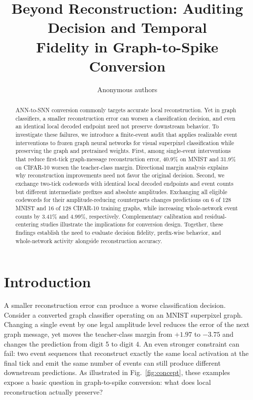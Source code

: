 \documentclass[10pt,twocolumn,letterpaper]{article}
\title{Beyond Reconstruction: Auditing Decision and Temporal\\Fidelity in Graph-to-Spike Conversion}
\author{Anonymous authors}
\begin{document}
\makeatletter
\def\columnwiseLineNumber{%
  \if@firstcolumn
    \makeLineNumberLeft
  \else
    \makeLineNumberRight
  \fi}
\let\makeLineNumberOdd\columnwiseLineNumber
\let\makeLineNumberEven\columnwiseLineNumber
\makeatother
\maketitle

\begin{abstract}
ANN-to-SNN conversion commonly targets accurate local reconstruction. Yet in graph classifiers, a smaller reconstruction error can worsen a classification decision, and even an identical local decoded endpoint need not preserve downstream behavior. To investigate these failures, we introduce a finite-event audit that applies realizable event interventions to frozen graph neural networks for visual superpixel classification while preserving the graph and pretrained weights. First, among single-event interventions that reduce first-tick graph-message reconstruction error, 40.9\% on MNIST and 31.9\% on CIFAR-10 worsen the teacher-class margin. Directional margin analysis explains why reconstruction improvements need not favor the original decision. Second, we exchange two-tick codewords with identical local decoded endpoints and event counts but different intermediate prefixes and absolute amplitudes. Exchanging all eligible codewords for their amplitude-reducing counterparts changes predictions on 6 of 128 MNIST and 16 of 128 CIFAR-10 training graphs, while increasing whole-network event counts by 3.41\% and 4.99\%, respectively. Complementary calibration and residual-centering studies illustrate the implications for conversion design. Together, these findings establish the need to evaluate decision fidelity, prefix-wise behavior, and whole-network activity alongside reconstruction accuracy.
\end{abstract}

\section{Introduction}
A smaller reconstruction error can produce a worse classification decision. Consider a converted graph classifier operating on an MNIST superpixel graph. Changing a single event by one legal amplitude level reduces the error of the next graph message, yet moves the teacher-class margin from $+1.97$ to $-3.75$ and changes the prediction from digit 5 to digit 4. An even stronger constraint can fail: two event sequences that reconstruct exactly the same local activation at the final tick and emit the same number of events can still produce different downstream predictions. As illustrated in Fig.~\ref{fig:concept}, these examples expose a basic question in graph-to-spike conversion: what does local reconstruction actually preserve?
\end{document}
